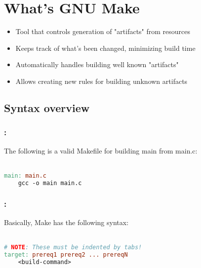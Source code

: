 \section{What's GNU Make}

\begin{frame}{\secname}
    \begin{itemize}
        \item Tool that controls generation of "artifacts" from resources
        \item Keeps track of what's been changed, minimizing build time
        \item Automatically handles building well known "artifacts"
        \item Allows creating new rules for building unknown artifacts
    \end{itemize}
\end{frame}

\subsection{Syntax overview}
\begin{frame}[fragile]
    \frametitle{\secname: \small\subsecname\normalsize}

    The following is a valid Makefile for building main from main.c: \\~\\

    \begin{lstlisting}[language=make]
main: main.c
    gcc -o main main.c
    \end{lstlisting}

\end{frame}

\begin{frame}[fragile]
    \frametitle{\secname: \small\subsecname\normalsize}

    Basically, Make has the following syntax: \\~\\

    \begin{lstlisting}[language=make]
# NOTE: These must be indented by tabs!
target: prereq1 prereq2 ... prereqN
    <build-command>
    \end{lstlisting}
\end{frame}

